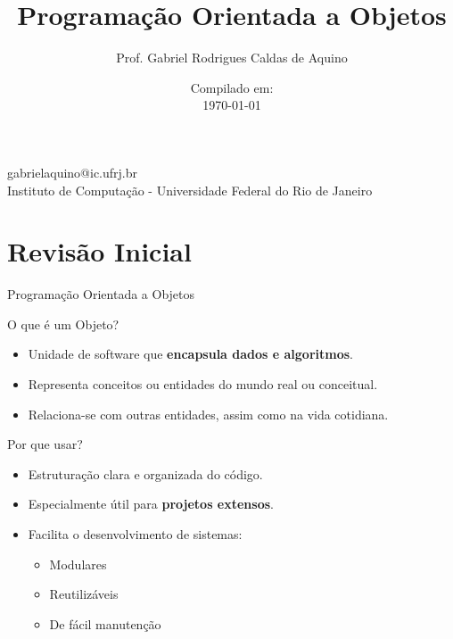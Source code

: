 \title{Programação Orientada a Objetos}

\author{Prof. Gabriel Rodrigues Caldas de Aquino}

\institute
{
    gabrielaquino@ic.ufrj.br\\
    
    Instituto de Computação -
    Universidade Federal do Rio de Janeiro %
}
\date{Compilado em: \\ \today} %


\section{Revisão Inicial}

\begin{frame}
    \titlepage
\end{frame}

\begin{frame}{Programação Orientada a Objetos}

\begin{block}{O que é um Objeto?}
\begin{itemize}
    \item Unidade de software que \textbf{encapsula dados e algoritmos}.
    \item Representa conceitos ou entidades do mundo real ou conceitual.
    \item Relaciona-se com outras entidades, assim como na vida cotidiana.
\end{itemize}
\end{block}

\begin{block}{Por que usar?}
\begin{itemize}
    \item Estruturação clara e organizada do código.
    \item Especialmente útil para \textbf{projetos extensos}.
    \item Facilita o desenvolvimento de sistemas:
    \begin{itemize}
        \item Modulares
        \item Reutilizáveis
        \item De fácil manutenção
    \end{itemize}
\end{itemize}
\end{block}

\end{frame}

